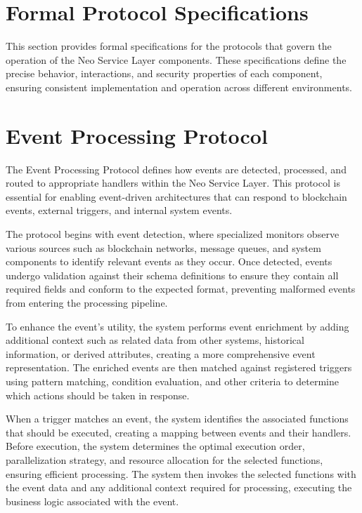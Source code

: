 \documentclass[11pt]{article}
\begin{document}
\section{Formal Protocol Specifications}
\label{subsec:formal-protocols}

This section provides formal specifications for the protocols that govern the operation of the Neo Service Layer components. These specifications define the precise behavior, interactions, and security properties of each component, ensuring consistent implementation and operation across different environments.

\section{Event Processing Protocol}
\label{subsec:event-protocol-spec}

The Event Processing Protocol defines how events are detected, processed, and routed to appropriate handlers within the Neo Service Layer. This protocol is essential for enabling event-driven architectures that can respond to blockchain events, external triggers, and internal system events.


The protocol begins with event detection, where specialized monitors observe various sources such as blockchain networks, message queues, and system components to identify relevant events as they occur. Once detected, events undergo validation against their schema definitions to ensure they contain all required fields and conform to the expected format, preventing malformed events from entering the processing pipeline.

To enhance the event's utility, the system performs event enrichment by adding additional context such as related data from other systems, historical information, or derived attributes, creating a more comprehensive event representation. The enriched events are then matched against registered triggers using pattern matching, condition evaluation, and other criteria to determine which actions should be taken in response.

When a trigger matches an event, the system identifies the associated functions that should be executed, creating a mapping between events and their handlers. Before execution, the system determines the optimal execution order, parallelization strategy, and resource allocation for the selected functions, ensuring efficient processing. The system then invokes the selected functions with the event data and any additional context required for processing, executing the business logic associated with the event.
\end{document}
